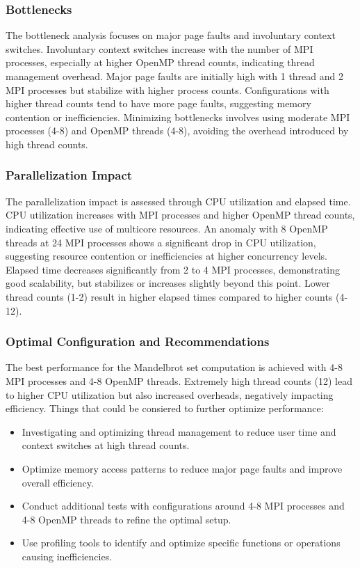 \documentclass[
]{article}
\providecommand{\tightlist}{%
  \setlength{\itemsep}{0pt}\setlength{\parskip}{0pt}}
\begin{document}
\subsubsection{Bottlenecks}\label{bottlenecks-3}

The bottleneck analysis focuses on major page faults and involuntary
context switches. Involuntary context switches increase with the number
of MPI processes, especially at higher OpenMP thread counts, indicating
thread management overhead. Major page faults are initially high with 1
thread and 2 MPI processes but stabilize with higher process counts.
Configurations with higher thread counts tend to have more page faults,
suggesting memory contention or inefficiencies. Minimizing bottlenecks
involves using moderate MPI processes (4-8) and OpenMP threads (4-8),
avoiding the overhead introduced by high thread counts.

\subsubsection{Parallelization Impact}\label{parallelization-impact}

The parallelization impact is assessed through CPU utilization and
elapsed time. CPU utilization increases with MPI processes and higher
OpenMP thread counts, indicating effective use of multicore resources.
An anomaly with 8 OpenMP threads at 24 MPI processes shows a significant
drop in CPU utilization, suggesting resource contention or
inefficiencies at higher concurrency levels. Elapsed time decreases
significantly from 2 to 4 MPI processes, demonstrating good scalability,
but stabilizes or increases slightly beyond this point. Lower thread
counts (1-2) result in higher elapsed times compared to higher counts
(4-12).

\subsubsection{Optimal Configuration and
Recommendations}\label{optimal-configuration-and-recommendations}

The best performance for the Mandelbrot set computation is achieved with
4-8 MPI processes and 4-8 OpenMP threads. Extremely high thread counts
(12) lead to higher CPU utilization but also increased overheads,
negatively impacting efficiency. Things that could be consiered to
further optimize performance:

\begin{itemize}
\tightlist
\item
  Investigating and optimizing thread management to reduce user time and
  context switches at high thread counts.
\item
  Optimize memory access patterns to reduce major page faults and
  improve overall efficiency.
\item
  Conduct additional tests with configurations around 4-8 MPI processes
  and 4-8 OpenMP threads to refine the optimal setup.
\item
  Use profiling tools to identify and optimize specific functions or
  operations causing inefficiencies.
\end{itemize}
\end{document}
